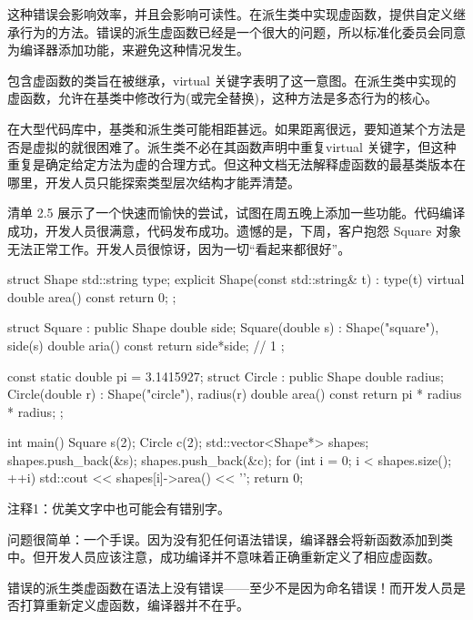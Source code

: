 这种错误会影响效率，并且会影响可读性。在派生类中实现虚函数，提供自定义继承行为的方法。错误的派生虚函数已经是一个很大的问题，所以标准化委员会同意为编译器添加功能，来避免这种情况发生。


包含虚函数的类旨在被继承，virtual 关键字表明了这一意图。在派生类中实现的虚函数，允许在基类中修改行为(或完全替换)，这种方法是多态行为的核心。

在大型代码库中，基类和派生类可能相距甚远。如果距离很远，要知道某个方法是否是虚拟的就很困难了。派生类不必在其函数声明中重复virtual 关键字，但这种重复是确定给定方法为虚的合理方式。但这种文档无法解释虚函数的最基类版本在哪里，开发人员只能探索类型层次结构才能弄清楚。

清单 2.5 展示了一个快速而愉快的尝试，试图在周五晚上添加一些功能。代码编译成功，开发人员很满意，代码发布成功。遗憾的是，下周，客户抱怨 Square 对象无法正常工作。开发人员很惊讶，因为一切“看起来都很好”。


\begin{cpp}
struct Shape {
  std::string type;
  explicit Shape(const std::string& t) : type(t) {}
  virtual double area() const { return 0; }
};

struct Square : public Shape {
  double side;
  Square(double s) : Shape("square"), side(s) {}
  double aria() const { return side*side; } // 1
};

const static double pi = 3.1415927;
struct Circle : public Shape {
  double radius;
  Circle(double r) : Shape("circle"), radius(r) {}
  double area() const { return pi * radius * radius; }
};

int main() {
  Square s(2);
  Circle c(2);
  std::vector<Shape*> shapes;
  shapes.push_back(&s);
  shapes.push_back(&c);
  for (int i = 0; i < shapes.size(); ++i)
    std::cout << shapes[i]->area() << '\n';
  return 0;
}
\end{cpp}

{\footnotesize
注释1：优美文字中也可能会有错别字。
}


问题很简单：一个手误。因为没有犯任何语法错误，编译器会将新函数添加到类中。但开发人员应该注意，成功编译并不意味着正确重新定义了相应虚函数。

错误的派生类虚函数在语法上没有错误——至少不是因为命名错误！而开发人员是否打算重新定义虚函数，编译器并不在乎。


